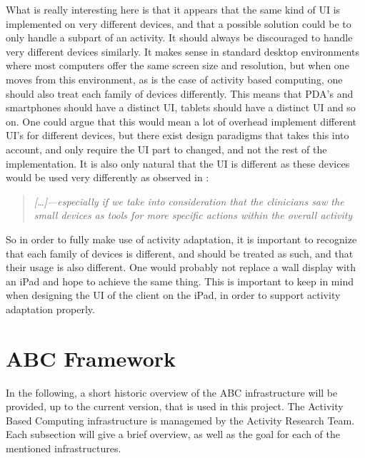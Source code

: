 What is really interesting here is that it appears that the same kind of UI is implemented on very different devices, and that a possible solution could be to only handle a subpart of an activity. It should always be discouraged to handle very different devices similarly. It makes sense in standard desktop environments where most computers offer the same screen size and resolution, but when one moves from this environment, as is the case of activity based computing, one should also treat each family of devices differently. This means that PDA's and smartphones should have a distinct UI, tablets should have a distinct UI and so on. One could argue that this would mean a lot of overhead implement different UI's for different devices, but there exist design paradigms that takes this into account, and only require the UI part to changed, and not the rest of the implementation. It is also only natural that the UI is different as these devices would be used very differently as observed in \citet{bardram2009}:

\begin{quotation}
	\emph{
		[\ldots]—especially if we take into consideration that the clinicians saw the small devices as tools for more specific actions within the overall activity
	} 
\end{quotation}

So in order to fully make use of activity adaptation, it is important to recognize that each family of devices is different, and should be treated as such, and that their usage is also different. One would probably not replace a wall display with an iPad and hope to achieve the same thing. This is important to keep in mind when designing the UI of the client on the iPad, in order to support activity adaptation properly.

\section{ABC Framework}
In the following, a short historic overview of the ABC infrastructure will be provided, up to the current version, that is used in this project. The Activity Based Computing infrastructure is managemed by the Activity Research Team. Each subsection will give a brief overview, as well as the goal for each of the mentioned infrastructures.

